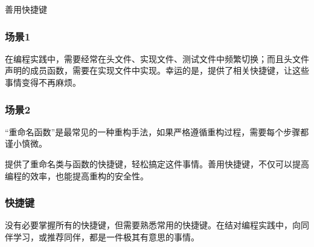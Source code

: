\begin{content}
\begin{episode}{善用快捷键}
\begin{content}

\subsubsection{场景1}

在编程实践中，需要经常在头文件、实现文件、测试文件中频繁切换；而且头文件声明的成员函数，需要在实现文件中实现。幸运的是，提供了相关快捷键，让这些事情变得不再麻烦。

\begin{enum}
\end{enum}

\subsubsection{场景2}

“重命名函数”是最常见的一种重构手法，如果严格遵循重构过程，需要每个步骤都谨小慎微。

\begin{enum}
\end{enum}

提供了重命名类与函数的快捷键，轻松搞定这件事情。善用快捷键，不仅可以提高编程的效率，也能提高重构的安全性。

\subsubsection{快捷键}

没有必要掌握所有的快捷键，但需要熟悉常用的快捷键。在结对编程实践中，向同伴学习，或推荐同伴，都是一件极其有意思的事情。

\begin{enum}
\begin{enum}
\end{enum}


\end{enum}
\end{content}
\end{episode}
\end{content}
